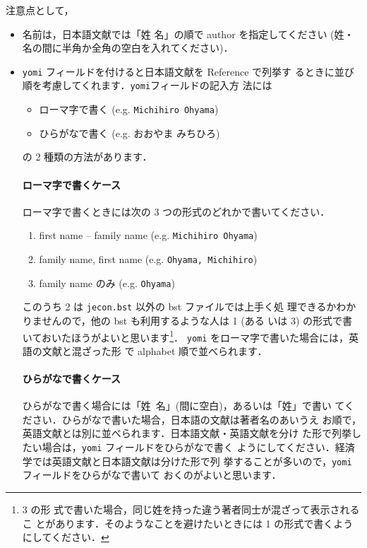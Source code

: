 \documentclass[a4j,10pt]{jarticle}
\begin{document}
注意点として，
\begin{itemize}
\item 名前は，日本語文献では「姓 名」の順で author を指定してください
  (姓・名の間に半角か全角の空白を入れてください)．
 \item \texttt{yomi} フィールドを付けると日本語文献を Reference で列挙す
       るときに並び順を考慮してくれます．\texttt{yomi}フィールドの記入方
       法には
       \begin{itemize}
        \item ローマ字で書く (e.g. \texttt{Michihiro Ohyama})
        \item ひらがなで書く (e.g. おおやま みちひろ)
       \end{itemize}
       の 2 種類の方法があります．

       \paragraph{ローマ字で書くケース}
       ローマ字で書くときには次の 3 つの形式のどれかで書いてください．
       \begin{enumerate}
        \item first name -- family name (e.g. \texttt{Michihiro Ohyama})
        \item family name, first name (e.g. \texttt{Ohyama, Michihiro})
        \item family name のみ (e.g. \texttt{Ohyama})
       \end{enumerate}
       このうち 2 は \texttt{jecon.bst} 以外の bst ファイルでは上手く処
       理できるかわかりませんので，他の bst も利用するような人は 1 (ある
       いは 3) の形式で書いておいたほうがよいと思います\footnote{3 の形
       式で書いた場合，同じ姓を持った違う著者同士が混ざって表示されるこ
       とがあります．そのようなことを避けたいときには 1 の形式で書くよう
       にしてください．}．
       \texttt{yomi} をローマ字で書いた場合には，英語の文献と混ざった形
       で alphabet 順で並べられます．

       \paragraph{ひらがなで書くケース}
       ひらがなで書く場合には「姓\ 名」(間に空白)，あるいは「姓」で書い
       てください．ひらがなで書いた場合，日本語の文献は著者名のあいうえ
       お順で，英語文献とは別に並べられます．日本語文献・英語文献を分け
       た形で列挙したい場合は，\texttt{yomi} フィールドをひらがなで書く
       ようにしてください．経済学では英語文献と日本語文献は分けた形で列
       挙することが多いので，\texttt{yomi} フィールドをひらがなで書いて
       おくのがよいと思います．


\end{itemize}
\end{document}
